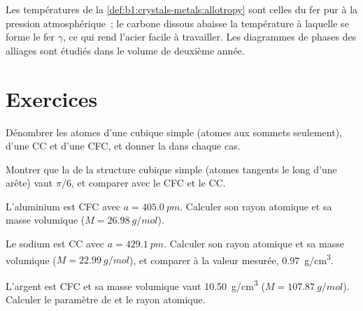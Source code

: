 \begin{remark}\label{rem:b1:crystals-metals:iron-T}
Les températures de la \cref{def:b1:crystals-metals:allotropy} sont
celles du fer pur à la pression atmosphérique~; le carbone dissous
abaisse la température à laquelle se forme le fer $\gamma$, ce qui rend
l'acier facile à travailler. Les diagrammes de phases des alliages sont
étudiés dans le volume de deuxième année.
\end{remark}

\section{Exercices}

\begin{exercise}[$\star$]\label{exo:b1:crystals-metals:1}
Dénombrer les atomes d'une  cubique simple (atomes aux sommets
seulement), d'une  CC et d'une  CFC, et donner la 
dans chaque cas.
\end{exercise}

\begin{exercise}[$\star$]\label{exo:b1:crystals-metals:2}
Montrer que la  de la structure cubique simple (atomes tangents
le long d'une arête) vaut $\pi/6$, et comparer avec le CFC et le CC.
\end{exercise}

\begin{exercise}[$\star$]\label{exo:b1:crystals-metals:3}
L'aluminium est CFC avec $a = \qty{405.0}{pm}$. Calculer son rayon
atomique et sa masse volumique ($M = \qty{26.98}{g/mol}$).
\end{exercise}

\begin{exercise}[$\star$]\label{exo:b1:crystals-metals:4}
Le sodium est CC avec $a = \qty{429.1}{pm}$. Calculer son rayon atomique
et sa masse volumique ($M = \qty{22.99}{g/mol}$), et comparer à la valeur
mesurée, \qty{0.97}{g/cm^3}.
\end{exercise}

\begin{exercise}[$\star\star$]\label{exo:b1:crystals-metals:5}
L'argent est CFC et sa masse volumique vaut \qty{10.50}{g/cm^3}
($M = \qty{107.87}{g/mol}$). Calculer le paramètre de  et le rayon
atomique.
\end{exercise}

